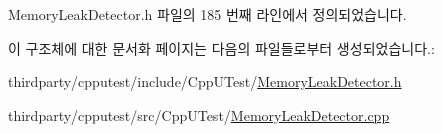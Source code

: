 Memory\+Leak\+Detector.\+h 파일의 185 번째 라인에서 정의되었습니다.



이 구조체에 대한 문서화 페이지는 다음의 파일들로부터 생성되었습니다.\+:\begin{DoxyCompactItemize}
\item 
thirdparty/cpputest/include/\+Cpp\+U\+Test/\hyperlink{_memory_leak_detector_8h}{Memory\+Leak\+Detector.\+h}\item 
thirdparty/cpputest/src/\+Cpp\+U\+Test/\hyperlink{_memory_leak_detector_8cpp}{Memory\+Leak\+Detector.\+cpp}\end{DoxyCompactItemize}

